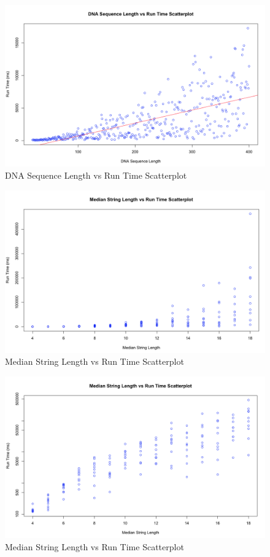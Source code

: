 \documentclass[paper=a4, fontsize=11pt]{scrartcl} %
\numberwithin{equation}{section} %
\numberwithin{figure}{section} %
\numberwithin{table}{section} %
\begin{document}
\begin{enumerate}
\begin{figure}[h]
\centering
\includegraphics[width=6.75in]{Figures/DNASeqLengthVsRunTimeScatterplot.png}
\caption{DNA Sequence Length vs Run Time Scatterplot}
\label{SeqLenVRunTime}
\end{figure}

\begin{figure}[h]
\centering
\includegraphics[width=6.75in]{Figures/MedianStringLengthvsRunTimeScatterplot.png}
\caption{Median String Length vs Run Time Scatterplot}
\label{MedLenVRunTime}
\end{figure}

\begin{figure}[h]
\centering
\includegraphics[width=6.75in]{Figures/MedianStringLengthvsLog2RunTimeScatterplot.png}
\caption{Median String Length vs Run Time Scatterplot}
\label{MedLenVLog2RunTime}
\end{figure}


\end{enumerate}
\end{document}
